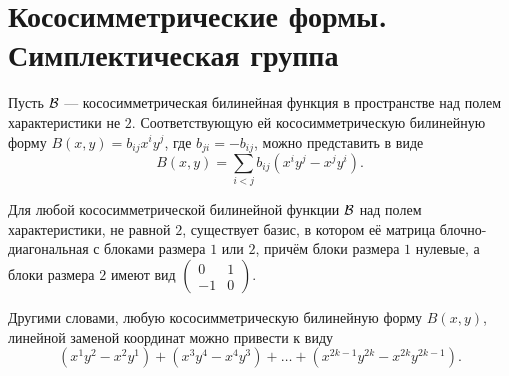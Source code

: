 \section{Кососимметрические формы. Симплектическая группа}

Пусть $\mathcal{B}$ --- кососимметрическая билинейная функция в пространстве над полем характеристики не $2$. Соответствующую ей кососимметрическую билинейную форму $B(x, y) = b_{ij}x^iy^j$, где $b_{ji} = -b_{ij}$, можно представить в виде
\[
    B(x, y) = \sum_{i < j}b_{ij}(x^iy^j - x^jy^i).
\]

\begin{theorem}
    Для любой кососимметрической билинейной функции $\mathcal{B}$ над полем характеристики, не равной $2$, существует базис, в котором её матрица блочно-диагональная с блоками размера $1$ или $2$, причём блоки размера $1$ нулевые, а блоки размера $2$ имеют вид
    $
    \begin{pmatrix}
        0 & 1\\
        -1 & 0
    \end{pmatrix}
    $.

    Другими словами, любую кососимметрическую билинейную форму $B(x, y)$, линейной заменой координат можно привести к виду
    \[
        (x^1y^2 - x^2y^1) + (x^3y^4 - x^4y^3) + \ldots + (x^{2k - 1}y^{2k} - x^{2k}y^{2k - 1}).
    \]
\end{theorem}

